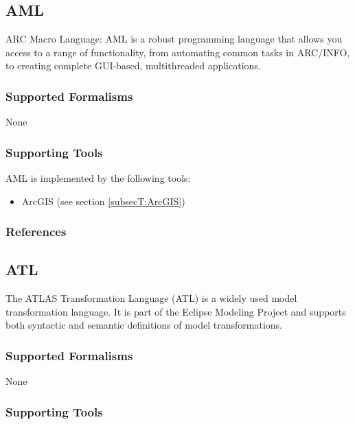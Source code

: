 \subsection{AML}
\label{subsecL:AML}


ARC Macro Language:
AML is a robust programming language that allows you access to a range of functionality, from automating common tasks in ARC/INFO, to creating complete GUI-based, multithreaded applications.

\subsubsection{Supported Formalisms}

None


\subsubsection{Supporting Tools}

AML is implemented by the following tools:
\begin{itemize}
	\item ArcGIS (see section \ref{subsecT:ArcGIS})
\end{itemize}


\subsubsection{References}





\subsection{ATL}
\label{subsecL:ATL}


The ATLAS Transformation Language (ATL) is a widely used model transformation language. 
It is part of the Eclipse Modeling Project and supports both syntactic and semantic definitions of model transformations.

\subsubsection{Supported Formalisms}

None


\subsubsection{Supporting Tools}


